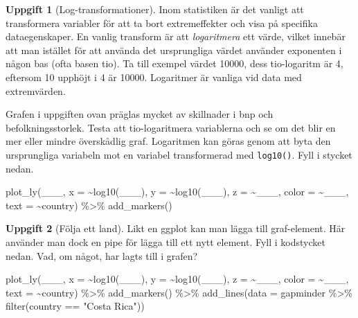 \documentclass[
]{book}
\newenvironment{Shaded}{\begin{snugshade}}{\end{snugshade}}
\newcommand{\AttributeTok}[1]{\textcolor[rgb]{0.77,0.63,0.00}{#1}}
\newcommand{\FunctionTok}[1]{\textcolor[rgb]{0.00,0.00,0.00}{#1}}
\newcommand{\NormalTok}[1]{#1}
\newcommand{\SpecialCharTok}[1]{\textcolor[rgb]{0.00,0.00,0.00}{#1}}
\newcommand{\StringTok}[1]{\textcolor[rgb]{0.31,0.60,0.02}{#1}}
\theoremstyle{definition}
\theoremstyle{definition}
\theoremstyle{definition}
\newtheorem{exercise}{Uppgift}[chapter]
\theoremstyle{definition}
\theoremstyle{remark}
\begin{document}
\begin{exercise}[Log-transformationer]

Inom statistiken är det vanligt att transformera variabler för att ta bort extremeffekter och visa på specifika dataegenskaper. En vanlig transform är att \emph{logaritmera} ett värde, vilket innebär att man istället för att använda det ursprungliga värdet använder exponenten i någon bas (ofta basen tio). Ta till exempel värdet 10000, dess tio-logaritm är 4, eftersom 10 upphöjt i 4 är 10000. Logaritmer är vanliga vid data med extremvärden.

Grafen i uppgiften ovan präglas mycket av skillnader i bnp och befolkningsstorlek. Testa att tio-logaritmera variablerna och se om det blir en mer eller mindre överskådlig graf. Logaritmen kan göras genom att byta den ursprungliga variabeln mot en variabel transformerad med \texttt{log10()}. Fyll i stycket nedan.

\begin{Shaded}
\begin{Highlighting}[]
\FunctionTok{plot\_ly}\NormalTok{(\_\_\_, }\AttributeTok{x =} \SpecialCharTok{\textasciitilde{}}\FunctionTok{log10}\NormalTok{(\_\_\_), }\AttributeTok{y =} \SpecialCharTok{\textasciitilde{}}\FunctionTok{log10}\NormalTok{(\_\_\_), }\AttributeTok{z =} \SpecialCharTok{\textasciitilde{}}\NormalTok{\_\_\_, }\AttributeTok{color =} \SpecialCharTok{\textasciitilde{}}\NormalTok{\_\_\_, }\AttributeTok{text =} \SpecialCharTok{\textasciitilde{}}\NormalTok{country) }\SpecialCharTok{\%\textgreater{}\%} 
  \FunctionTok{add\_markers}\NormalTok{()}
\end{Highlighting}
\end{Shaded}

\end{exercise}

\begin{exercise}[Följa ett land]

Likt en ggplot kan man lägga till graf-element. Här använder man dock en pipe för lägga till ett nytt element. Fyll i kodstycket nedan. Vad, om något, har lagts till i grafen?

\begin{Shaded}
\begin{Highlighting}[]
\FunctionTok{plot\_ly}\NormalTok{(\_\_\_, }\AttributeTok{x =} \SpecialCharTok{\textasciitilde{}}\FunctionTok{log10}\NormalTok{(\_\_\_), }\AttributeTok{y =} \SpecialCharTok{\textasciitilde{}}\FunctionTok{log10}\NormalTok{(\_\_\_), }\AttributeTok{z =} \SpecialCharTok{\textasciitilde{}}\NormalTok{\_\_\_, }\AttributeTok{color =} \SpecialCharTok{\textasciitilde{}}\NormalTok{\_\_\_, }\AttributeTok{text =} \SpecialCharTok{\textasciitilde{}}\NormalTok{country) }\SpecialCharTok{\%\textgreater{}\%} 
  \FunctionTok{add\_markers}\NormalTok{() }\SpecialCharTok{\%\textgreater{}\%} 
  \FunctionTok{add\_lines}\NormalTok{(}\AttributeTok{data =}\NormalTok{ gapminder }\SpecialCharTok{\%\textgreater{}\%} \FunctionTok{filter}\NormalTok{(country }\SpecialCharTok{==} \StringTok{"Costa Rica"}\NormalTok{))}
\end{Highlighting}
\end{Shaded}

\end{exercise}
\end{document}
